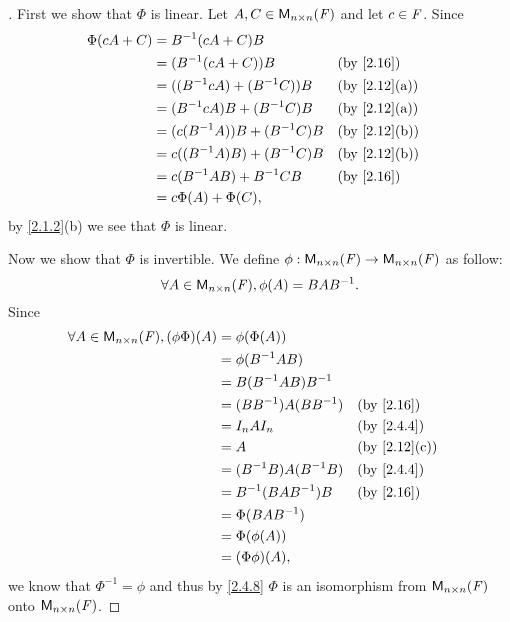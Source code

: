 \begin{proof}[]
	First we show that \(\Phi\) is linear.
	Let \(A, C \in \mathsf{M}_{{n} \times n}({\mathit{F}})\) and let \(c \in \mathit{F}\).
	Since
	\begin{align*}
		\Phi(cA + C) & = B^{-1} (cA + C) B                                 \\
		             & = (B^{-1} (cA + C)) B             &  & \by{2.16}    \\
		             & = ((B^{-1} c A) + (B^{-1} C)) B   &  & \by{2.12}[a] \\
		             & = (B^{-1} c A) B + (B^{-1} C) B   &  & \by{2.12}[a] \\
		             & = (c (B^{-1} A)) B + (B^{-1} C) B &  & \by{2.12}[b] \\
		             & = c ((B^{-1} A) B) + (B^{-1} C) B &  & \by{2.12}[b] \\
		             & = c (B^{-1} A B) + B^{-1} CB      &  & \by{2.16}    \\
		             & = c \Phi(A) + \Phi(C),
	\end{align*}
	by \cref{2.1.2}(b) we see that \(\Phi\) is linear.

	Now we show that \(\Phi\) is invertible.
	We define \(\phi : \mathsf{M}_{{n} \times n}({\mathit{F}}) \to \mathsf{M}_{{n} \times n}({\mathit{F}})\) as follow:
	\[
		\forall A \in \mathsf{M}_{{n} \times n}({\mathit{F}}), \phi(A) = BAB^{-1}.
	\]
	Since
	\begin{align*}
		\forall A \in \ms{n}{n}{\F}, (\phi \Phi)(A) & = \phi(\Phi(A))                             \\
		                                            & = \phi(B^{-1} AB)                           \\
		                                            & = B(B^{-1} AB) B^{-1}                       \\
		                                            & = (BB^{-1}) A (BB^{-1})   &  & \by{2.16}    \\
		                                            & = I_n A I_n               &  & \by{2.4.4}   \\
		                                            & = A                       &  & \by{2.12}[c] \\
		                                            & = (B^{-1} B) A (B^{-1} B) &  & \by{2.4.4}   \\
		                                            & = B^{-1} (BAB^{-1}) B     &  & \by{2.16}    \\
		                                            & = \Phi(BAB^{-1})                            \\
		                                            & = \Phi(\phi(A))                             \\
		                                            & = (\Phi \phi)(A),
	\end{align*}
	we know that \(\Phi^{-1} = \phi\) and thus by \cref{2.4.8} \(\Phi\) is an isomorphism from \(\mathsf{M}_{{n} \times n}({\mathit{F}})\) onto \(\mathsf{M}_{{n} \times n}({\mathit{F}})\).
\end{proof}

